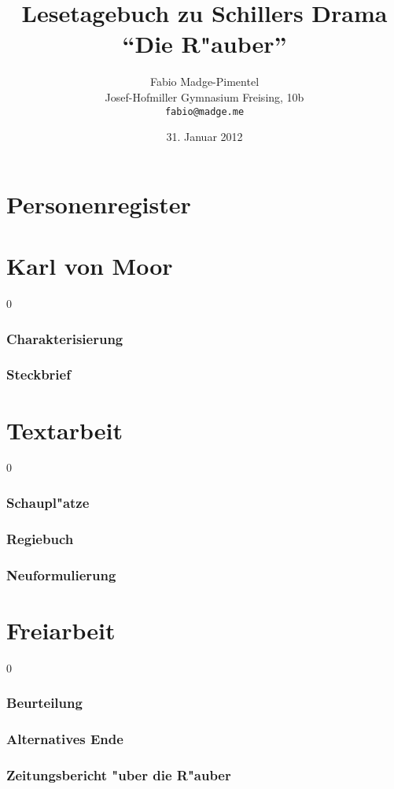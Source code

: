 \documentclass[a4paper, titlepage, final]{article}
\author{Fabio Madge-Pimentel\\
	Josef-Hofmiller Gymnasium Freising, 10b\\
	\texttt{fabio@madge.me}}
\title{Lesetagebuch zu Schillers Drama "`Die R"auber"'}
\date{31. Januar 2012}
\begin{document}
\maketitle

\tableofcontents
\newpage

\part{Personenregister}
	
\newpage
\part{Karl von Moor}
	\setcounter {section} {0}
	\section{Charakterisierung}
		
	\section{Steckbrief}
		
\newpage
\part{Textarbeit}
	\setcounter {section} {0}
	\section{Schaupl"atze}
		
	\newpage
	\section{Regiebuch}
		
	\newpage
	\section{Neuformulierung}
		
\newpage
\part{Freiarbeit}
	\setcounter {section} {0}
	\section{Beurteilung}
		
	\section{Alternatives Ende}
		
	\section{Zeitungsbericht "uber die R"auber}
				
\end{document}
